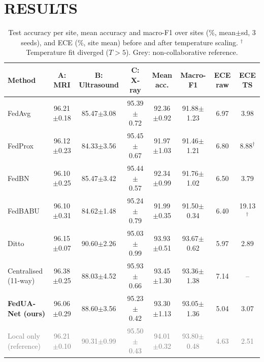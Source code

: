 \documentclass[]{spie}
\newcommand{\refrow}[1]{\textcolor{gray}{#1}}
\begin{document}
\section{RESULTS}
\label{sec:results}

\begin{table}[t]
\caption{Test accuracy per site, mean accuracy and macro-F1 over sites (\%, mean$\pm$sd, 3 seeds), and ECE (\%, site mean) before and after temperature scaling. $^\dagger$Temperature fit diverged ($T>5$). Grey: non-collaborative reference.}
\label{tab:main}
\centering\footnotesize\setlength{\tabcolsep}{3.6pt}
\begin{tabular}{lccccccc}
\toprule
Method & A: MRI & B: Ultrasound & C: X-ray & Mean acc. & Macro-F1 & ECE raw & ECE TS \\
\midrule
FedAvg\cite{mcmahan2017communication}   & 96.21$\pm$0.18 & 85.47$\pm$3.08 & 95.39$\pm$0.72 & 92.36$\pm$0.92 & 91.88$\pm$1.23 & 6.97 & 3.98 \\
FedProx\cite{litian2020fedprox}         & 96.12$\pm$0.23 & 84.33$\pm$3.56 & 95.45$\pm$0.67 & 91.97$\pm$1.03 & 91.46$\pm$1.21 & 6.80 & 8.88$^\dagger$ \\
FedBN\cite{lixiaoxiao2021fedbn}         & 96.10$\pm$0.25 & 85.47$\pm$3.42 & 95.44$\pm$0.57 & 92.34$\pm$0.99 & 91.76$\pm$1.02 & 6.50 & 3.79 \\
FedBABU\cite{oh2022fedbabu}             & 96.10$\pm$0.31 & 84.62$\pm$1.48 & 95.24$\pm$0.79 & 91.99$\pm$0.35 & 91.50$\pm$0.34 & 6.40 & 19.13$^\dagger$ \\
Ditto\cite{litian2021ditto}             & 96.15$\pm$0.07 & 90.60$\pm$2.26 & 95.03$\pm$0.99 & 93.93$\pm$0.51 & 93.67$\pm$0.62 & 5.97 & 2.89 \\
Centralised (11-way)                    & 96.38$\pm$0.25 & 88.03$\pm$4.52 & 95.93$\pm$0.66 & 93.45$\pm$1.30 & 93.36$\pm$1.38 & 7.14 & -- \\
\textbf{FedUA-Net (ours)}               & 96.06$\pm$0.29 & 88.60$\pm$3.56 & 95.23$\pm$0.42 & 93.30$\pm$1.13 & 93.05$\pm$1.36 & 5.04 & 3.07 \\
\midrule
\refrow{Local only (reference)}         & \refrow{96.21$\pm$0.10} & \refrow{90.31$\pm$0.99} & \refrow{95.50$\pm$0.43} & \refrow{94.01$\pm$0.32} & \refrow{93.80$\pm$0.48} & \refrow{4.63} & \refrow{2.51} \\
\bottomrule
\end{tabular}
\end{table}
\end{document}

